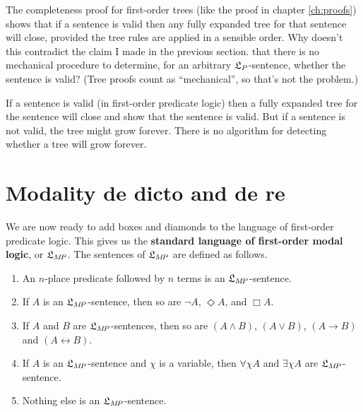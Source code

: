 \begin{exercise}
  The completeness proof for first-order trees (like the proof in chapter
  \ref{ch:proofs}) shows that if a sentence is valid then any fully expanded
  tree for that sentence will close, provided the tree rules are applied in a
  sensible order. Why doesn't this contradict the claim I made in the previous
  section. that there is no mechanical procedure to determine, for an arbitrary
  $\mathfrak{L}_P$-sentence, whether the sentence is valid? (Tree proofs count as
  ``mechanical'', so that's not the problem.)
\end{exercise}
\begin{solution}
  If a sentence is valid (in first-order predicate logic) then a fully expanded
  tree for the sentence will close and show that the sentence is valid. But if a
  sentence is not valid, the tree might grow forever. There is no algorithm for
  detecting whether a tree will grow forever. 
\end{solution}


\section{Modality de dicto and de re}


We are now ready to add boxes and diamonds to the language of first-order
predicate logic. This gives us the \textbf{standard language of first-order
  modal logic}, or $\mathfrak{L}_{M\!P}$. The sentences of $\mathfrak{L}_{M\!P}$ are defined as
follows.
%
\begin{enumerate}[leftmargin=9mm]
  \itemsep-1mm
  \item An $n$-place predicate followed by $n$ terms is an $\mathfrak{L}_{M\!P}$-sentence.
  \item If $A$ is an $\mathfrak{L}_{M\!P}$-sentence, then so are $\neg A$, $\Diamond A$,
        and $\Box A$.
  \item If $A$ and $B$ are $\mathfrak{L}_{M\!P}$-sentences, then so are $(A \land B)$,
        $(A \lor B)$, $(A \to B)$ and $(A \leftrightarrow B)$.
  \item If $A$ is an $\mathfrak{L}_{M\!P}$-sentence and $\chi$ is a variable, then
        $\forall \chi A$ and $\exists \chi A$ are $\mathfrak{L}_{M\!P}$-sentence.
  \item Nothing else is an $\mathfrak{L}_{M\!P}$-sentence.
\end{enumerate}

